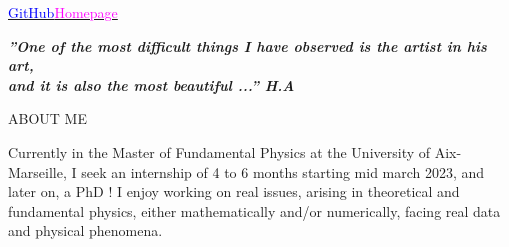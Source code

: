 \documentclass{resume} %
\begin{document}
\begin{center}
\faGithub\hspace*{0.1cm}\href{https://github.com/PhysicsAbdelhamid}{\textcolor{blue}{GitHub}}\hspace*{1cm}\faHome\hspace*{0.1cm}\href{https://abdelhamidhaddad.wordpress.com}{\textcolor{magenta}{Homepage}}
\end{center}

\begin{center}
\textit{\textbf{”One of the most difficult things I have observed is the artist in his art,\\and it is also the most beautiful ...” H.A}}
\end{center}


\begin{rSection}{ABOUT ME}

\par Currently in the Master of Fundamental Physics at the University of Aix-Marseille, I seek an internship of 4 to 6 months starting mid march 2023, and later on, a PhD ! I enjoy working on real issues, arising in theoretical and fundamental physics, either mathematically and/or numerically, facing real data and physical phenomena.   

\end{rSection}
\end{document}
